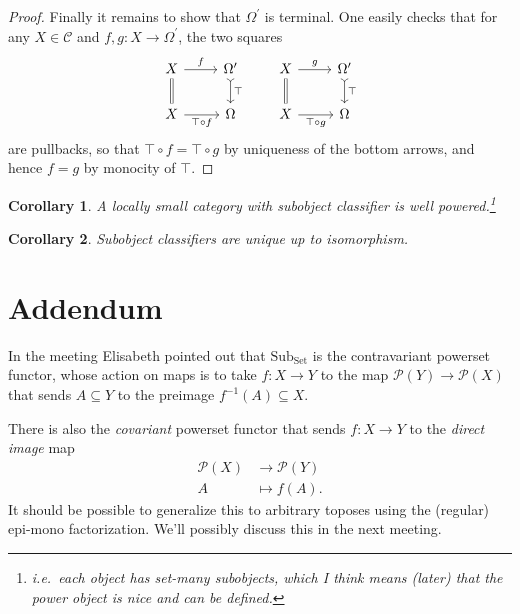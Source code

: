 \documentclass[a4paper, 11pt]{article}
\newcommand{\Set}{\mathrm{Set}}
\newcommand{\Sub}{\mathrm{Sub}}
\newtheorem{corollary}{Corollary}[theorem]
\theoremstyle{definition}
\theoremstyle{remark}
\begin{document}
\begin{proof}
Finally it remains to show that $\Omega^\prime$ is terminal.
One easily checks that for any $X \in \mathcal C$ and $f, g \colon X \rightarrow \Omega^\prime$, the two squares
\[
\begin{tikzcd}
    X \ar[d, equal] \ar[r, "f"] & \Omega^\prime \ar[d, tail, "\top"] \\
    X \ar[r, swap, "\top \circ f"] & \Omega
\end{tikzcd}
\qquad
\begin{tikzcd}
    X \ar[d, equal] \ar[r, "g"] & \Omega^\prime \ar[d, tail, "\top"] \\
    X \ar[r, swap, "\top \circ g"] & \Omega
\end{tikzcd}
\]
are pullbacks, so that $\top \circ f = \top \circ g$ by uniqueness of the bottom arrows, and hence $f = g$ by monocity of $\top$.
\end{proof}

\begin{corollary}
    A locally small category with subobject classifier is well powered.\footnote{i.e.\ each object has set-many subobjects, which I think means (later) that the power object is nice and can be defined.}
\end{corollary}

\begin{corollary}
    Subobject classifiers are unique up to isomorphism.
\end{corollary}

\newpage

\section*{Addendum}

In the meeting Elisabeth pointed out that $\Sub_\Set$ is the contravariant powerset functor, whose action on maps is to take $f \colon X \rightarrow Y$ to the map $\mathcal P(Y) \rightarrow \mathcal P(X)$ that sends $A \subseteq Y$ to the preimage $f^{-1}(A) \subseteq X$.

There is also the \emph{covariant} powerset functor that sends $f \colon X \rightarrow Y$ to the \emph{direct image} map
\begin{align*}
    \mathcal P(X) & \rightarrow \mathcal P(Y) \\
    A & \mapsto f(A).
\end{align*}
It should be possible to generalize this to arbitrary toposes using the (regular) epi-mono factorization.
We'll possibly discuss this in the next meeting.
\end{document}
